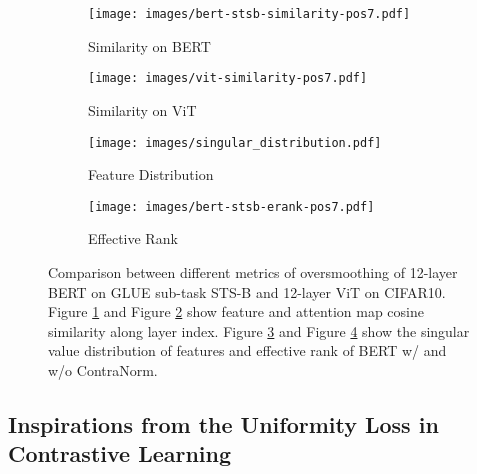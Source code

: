 \documentclass{article}
\theoremstyle{definition}
\theoremstyle{remark}
\theoremstyle{theorem}
\begin{document}
\begin{figure}
     \centering
     \begin{subfigure}[b]{0.245\textwidth}
         \centering
         \texttt{[image: images/bert-stsb-similarity-pos7.pdf]}
         \caption{Similarity on BERT}
         \label{fig:bert-sim}
     \end{subfigure}
     \begin{subfigure}[b]{0.245\textwidth}
         \centering
         \texttt{[image: images/vit-similarity-pos7.pdf]}
         \caption{Similarity on ViT}
         \label{fig:vit-sim}
     \end{subfigure}
     \begin{subfigure}[b]{0.245\textwidth}
         \centering
         \texttt{[image: images/singular\_distribution.pdf]}
         \caption{Feature Distribution}
         \label{fig:bert-singular}
     \end{subfigure}
     \begin{subfigure}[b]{0.245\textwidth}
         \centering
         \texttt{[image: images/bert-stsb-erank-pos7.pdf]}
         \caption{Effective Rank}
         \label{fig:bert-erank}
     \end{subfigure}
     \hfill
        \caption{Comparison between different metrics of oversmoothing of 12-layer BERT on GLUE sub-task STS-B and 12-layer ViT on CIFAR10. Figure \ref{fig:bert-sim} and Figure \ref{fig:vit-sim} show feature and attention map cosine similarity along layer index. Figure \ref{fig:bert-singular} and Figure \ref{fig:bert-erank} show the singular value distribution of features and effective rank of BERT w/ and w/o ContraNorm.}
        \label{fig:cossim}
        \vspace{-0.1 in}
\end{figure}


\subsection{Inspirations from the Uniformity Loss in Contrastive Learning}
\end{document}
